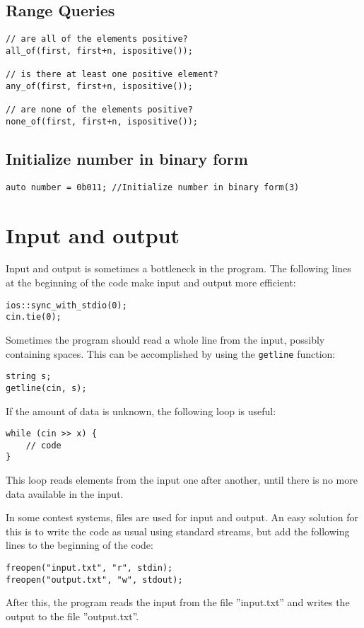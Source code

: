 \documentclass[twoside,12pt,a4paper,english]{book}
\theoremstyle{definition}
\theoremstyle{problemstyle}
\begin{document}
\subsection{Range Queries}
\begin{lstlisting}
// are all of the elements positive?
all_of(first, first+n, ispositive());

// is there at least one positive element?
any_of(first, first+n, ispositive());

// are none of the elements positive?
none_of(first, first+n, ispositive());
\end{lstlisting}
\subsection{Initialize number in binary form}
\begin{lstlisting}
auto number = 0b011; //Initialize number in binary form(3)
\end{lstlisting}
\newpage
\section{Input and output}
Input and output is sometimes
a bottleneck in the program.
The following lines at the beginning of the code
make input and output more efficient:

\begin{lstlisting}
ios::sync_with_stdio(0);
cin.tie(0);
\end{lstlisting}

Sometimes the program should read a whole line
from the input, possibly containing spaces.
This can be accomplished by using the
\texttt{getline} function:

\begin{lstlisting}
string s;
getline(cin, s);
\end{lstlisting}

If the amount of data is unknown, the following
loop is useful:
\begin{lstlisting}
while (cin >> x) {
    // code
}
\end{lstlisting}
This loop reads elements from the input
one after another, until there is no
more data available in the input.

In some contest systems, files are used for
input and output.
An easy solution for this is to write
the code as usual using standard streams,
but add the following lines to the beginning of the code:
\begin{lstlisting}
freopen("input.txt", "r", stdin);
freopen("output.txt", "w", stdout);
\end{lstlisting}
After this, the program reads the input from the file
''input.txt'' and writes the output to the file
''output.txt''.
\end{document}
